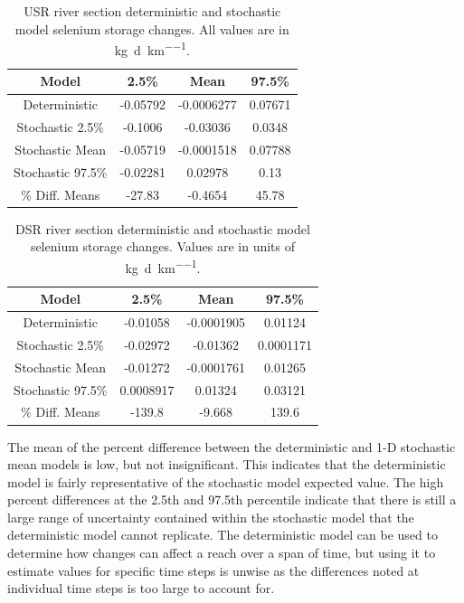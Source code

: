 \begin{linenumbers}
\begin{table}[htbp]
\centering
\caption[USR river section deterministic and stochastic model selenium storage changes.]{USR river section deterministic and stochastic model selenium storage changes.  All values are in \si{\kilo\gram\per\day\per\kilo\meter}.}
\label{tab:USRSeStore}
\begin{tabular}{c|ccc}
	\toprule
	Model& 2.5\% & Mean & 97.5\% \\
	\midrule
	\midrule
	Deterministic    &	-0.05792&	-0.0006277&	0.07671\\
	\midrule                                            
	Stochastic 2.5\% &	-0.1006&	-0.03036&	0.0348\\ 
	Stochastic Mean  &	-0.05719&	-0.0001518&	0.07788\\
	Stochastic 97.5\%&	-0.02281&	0.02978&	0.13\\   
	\midrule                                            
	\% Diff. Means&		-27.83&	-0.4654&	45.78\\
	\bottomrule
\end{tabular}
\end{table}

\begin{table}[htbp]
\centering
\caption[DSR river section deterministic and stochastic model selenium storage changes.]{DSR river section deterministic and stochastic model selenium storage changes.  Values are in units of \si{\kilo\gram\per\day\per\kilo\meter}.}
\label{tab:DSRSeStore}
\begin{tabular}{c|ccc}
	\toprule
	Model& 2.5\% & Mean & 97.5\% \\
	\midrule
	\midrule
	Deterministic    &	-0.01058&	-0.0001905&	0.01124\\
	\midrule                                              
	Stochastic 2.5\% &	-0.02972&	-0.01362&	0.0001171\\
	Stochastic Mean  &	-0.01272&	-0.0001761&	0.01265\\  
	Stochastic 97.5\%&	0.0008917&	0.01324&	0.03121\\  
	\midrule                                              
	\% Diff. Means&		-139.8&	-9.668&	139.6\\
	\bottomrule
\end{tabular}
\end{table}

The mean of the percent difference between the deterministic and 1-D stochastic mean models is low, but not insignificant.  This indicates that the deterministic model is fairly representative of the stochastic model expected value.  The high percent differences at the 2.5th and 97.5th percentile indicate that there is still a large range of uncertainty contained within the stochastic model that the deterministic model cannot replicate.  The deterministic model can be used to determine how changes can affect a reach over a span of time, but using it to estimate values for specific time steps is unwise as the differences noted at individual time steps is too large to account for.


\end{linenumbers}
